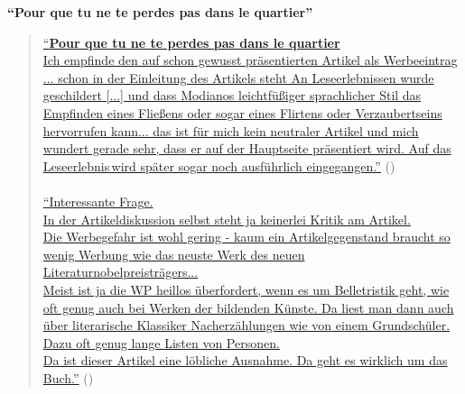 \documentclass[fontsize=12pt]{scrartcl}
\begin{document}
\textbf{"`Pour que tu ne te perdes pas dans le quartier"'}

\singlespacing
\begin{quote}
\href{https://de.wikipedia.org/w/index.php?title=Wikipedia_Diskussion:Hauptseite\&diff=prev\&oldid=136447261}{"`\textbf{Pour que tu ne te perdes pas dans le quartier}\\
Ich empfinde den auf schon gewusst pr\"asentierten Artikel als Werbeeintrag ... schon in der Einleitung des Artikels steht \flq An Leseerlebnissen wurde geschildert [...] und dass Modianos leichtf\"u{\ss}iger sprachlicher Stil das Empfinden eines Flie{\ss}ens oder sogar eines Flirtens oder Verzaubertseins hervorrufen kann\frq ... das ist f\"ur mich kein neutraler Artikel und mich wundert gerade sehr, dass er auf der Hauptseite pr\"asentiert wird. Auf das \flq Leseerlebnis\frq \,wird sp\"ater sogar noch ausf\"uhrlich eingegangen."'} (\cite{UserAnghy2014})\\
\\
\href{https://de.wikipedia.org/w/index.php?title=Wikipedia_Diskussion:Hauptseite\&diff=prev\&oldid=136449008}{"`Interessante Frage.\\
In der Artikeldis\-kus\-si\-on \mbox{selbst} steht ja keinerlei Kritik am Artikel.\\
Die Werbegefahr ist wohl gering - kaum ein Artikelgegenstand braucht so wenig Werbung wie das neuste Werk des neuen Literaturnobelpreis\-tr\"a\-gers...\\
Meist ist ja die WP heillos \"uberfordert, wenn es um Belletristik geht, wie oft genug auch bei Werken der bildenden K\"unste. Da liest man dann auch \"uber literarische Klassiker Nacherz\"ahlungen wie von einem Grundsch\"uler. Dazu oft genug lange Listen von Personen.\\
Da ist dieser Artikel eine l\"obliche Ausnahme. Da geht es wirklich um das Buch."'} (\cite{UserHummelhum2014}) 
\end{quote}
\onehalfspacing
\end{document}
